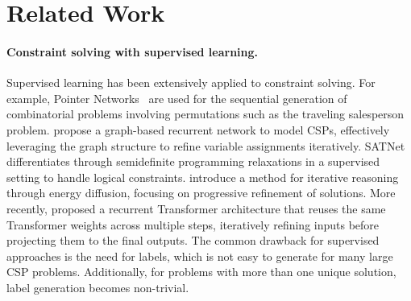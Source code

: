 \section{Related Work}
\paragraph{Constraint solving with supervised learning.}
Supervised learning has been extensively applied to constraint solving. For example, Pointer Networks~\cite{ptrnet} are used for the sequential generation of combinatorial problems involving permutations such as the traveling salesperson problem. \citet{rrn} propose a graph-based recurrent network to model CSPs, effectively leveraging the graph structure to refine variable assignments iteratively. SATNet~\cite{satnet} differentiates through semidefinite programming relaxations in a supervised setting to handle logical constraints. \citet{ired} introduce a method for iterative reasoning through energy diffusion, focusing on progressive refinement of solutions. More recently, \citet{iclr23Transformercsp} proposed a recurrent Transformer architecture that reuses the same Transformer weights across multiple steps, iteratively refining inputs before projecting them to the final outputs. The common drawback for supervised approaches is the need for labels, which is not easy to generate for many large CSP problems. Additionally, for problems with more than one unique solution, label generation becomes non-trivial. 






